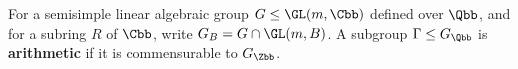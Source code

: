 \documentclass{amsart}
\begin{document}
For a semisimple linear algebraic group $G \leq \GL(m,\Cbb)$ defined over $\Qbb$, and for a subring $R$ of $\Cbb$, write $G_{B} = G \cap \GL(m,B)$. A subgroup $\Gamma \leq G_{\Qbb}$ is \textbf{arithmetic} if it is commensurable to $G_{\Zbb}$. 
\end{document}

